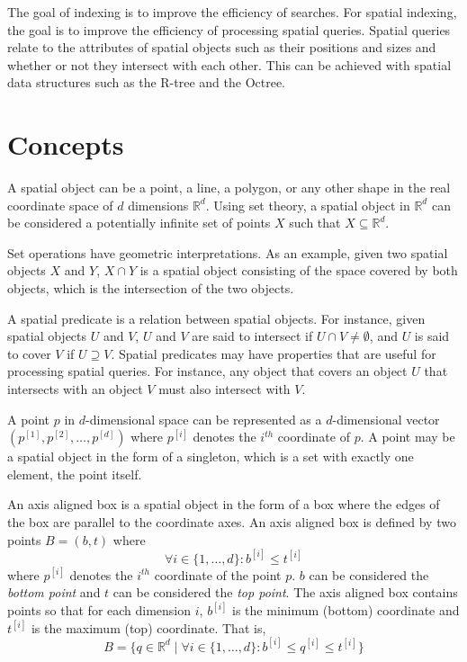 The goal of indexing is to improve the efficiency of searches. For spatial indexing, the goal is to improve the efficiency of processing spatial queries. Spatial queries relate to the attributes of spatial objects such as their positions and sizes and whether or not they intersect with each other. This can be achieved with spatial data structures such as the R-tree and the Octree.

\section{Concepts}

A spatial object can be a point, a line, a polygon, or any other shape in the real coordinate space of \(d\) dimensions \(\mathbb{R}^d\). Using set theory, a spatial object in \(\mathbb{R}^d\) can be considered a potentially infinite set of points \(X\) such that \(X \subseteq \mathbb{R}^d\).

Set operations have geometric interpretations. As an example, given two spatial objects \(X\) and \(Y\), \(X \cap Y\) is a spatial object consisting of the space covered by both objects, which is the intersection of the two objects.

A spatial predicate is a relation between spatial objects. For instance, given spatial objects \(U\) and \(V\), \(U\) and \(V\) are said to intersect if \(U \cap V \neq \emptyset\), and \(U\) is said to cover \(V\) if \(U \supseteq V\). Spatial predicates may have properties that are useful for processing spatial queries. For instance, any object that covers an object \(U\) that intersects with an object \(V\) must also intersect with \(V\).

A point \(p\) in \(d\)-dimensional space can be represented as a \(d\)-dimensional vector \((p^{[1]}, p^{[2]}, \dotsc, p^{[d]})\) where \(p^{[i]}\) denotes the \(i^{th}\) coordinate of \(p\). A point may be a spatial object in the form of a singleton, which is a set with exactly one element, the point itself.

An axis aligned box is a spatial object in the form of a box where the edges of the box are parallel to the coordinate axes. An axis aligned box is defined by two points \(B = (b, t)\) where
\[
  \forall i \in \{1, \dotsc, d\} :
  b^{[i]} \leq t^{[i]}
\]
where \(p^{[i]}\) denotes the \(i^{th}\) coordinate of the point \(p\). \(b\) can be considered the \emph{bottom point} and \(t\) can be considered the \emph{top point}. The axis aligned box contains points so that for each dimension \(i\), \(b^{[i]}\) is the minimum (bottom) coordinate and \(t^{[i]}\) is the maximum (top) coordinate. That is,
\[
  B = \{
    q \in \mathbb{R}^d \mid
    \forall i \in \{ 1, \dotsc, d \} :
    b^{[i]} \leq q^{[i]} \leq t^{[i]}
  \}
\]

